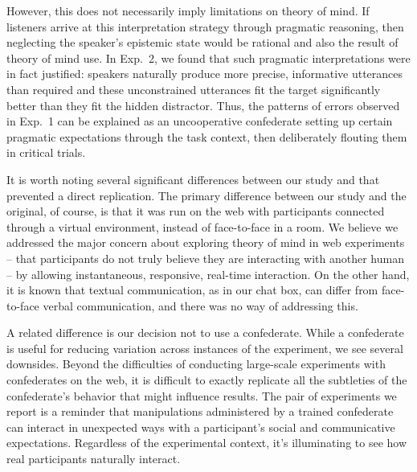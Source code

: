 \documentclass[10pt,letterpaper]{article}
\begin{document}
However, this does not necessarily imply limitations on theory of mind. If listeners arrive at this interpretation strategy through pragmatic reasoning, then neglecting the speaker's epistemic state would be rational and also the result of theory of mind use. In Exp.~2, we found that such pragmatic interpretations were in fact justified: speakers naturally produce more precise, informative utterances than required and these unconstrained utterances fit the target significantly better than they fit the hidden distractor. Thus, the patterns of errors observed in Exp.~1 can be explained as an uncooperative confederate setting up certain pragmatic expectations through the task context, then deliberately flouting them in critical trials. %

It is worth noting several significant differences between our study and  that prevented a direct replication. The primary difference between our study and the original, of course, is that it was run on the web with participants connected through a virtual environment, instead of face-to-face in a room. We believe we addressed the major concern about exploring theory of mind in web experiments -- that participants do not truly believe they are interacting with another human -- by allowing instantaneous, responsive, real-time interaction.  On the other hand, it is known that textual communication, as in our chat box, can differ from face-to-face verbal communication, and there was no way of addressing this. %

A related difference is our decision not to use a confederate. While a confederate is useful for reducing variation across instances of the experiment, we see several downsides. Beyond the difficulties of conducting large-scale experiments with confederates on the web, it is difficult to exactly replicate all the subtleties of the confederate's behavior that might influence results. The pair of experiments we report is a reminder that manipulations administered by a trained confederate can interact in unexpected ways with a participant's social and communicative expectations. Regardless of the experimental context, it's illuminating to see how real participants naturally interact.
\end{document}
